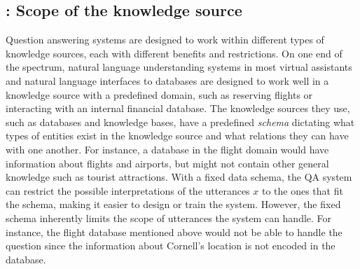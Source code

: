 \subsection{\Breadth: Scope of the knowledge source}
\label{sec:intro-breadth}

Question answering systems are designed to work
within different types of knowledge sources,
each with different benefits and restrictions.
On one end of the spectrum,
natural language understanding systems
in most virtual assistants
\cite{pieraccini1991stochastic,raymond2007generative,mesnil2014using}
and natural language interfaces to databases
\cite{hendrix1978developing,androutsopoulos95nlidb}
are designed to work well in a knowledge source
with a predefined domain,
such as reserving flights or interacting
with an internal financial database.
The knowledge sources they use,
such as databases and knowledge bases,
have a predefined \emph{schema}
dictating what types of entities exist in the knowledge source
and what relations they can have with one another.
For instance,
a database in the flight domain
would have information about flights and airports,
but might not contain other general knowledge such as tourist attractions.
With a fixed data schema,
the QA system can restrict the possible
interpretations of the utterances $x$
to the ones that fit the schema,
making it easier to design or train the system.
However,
the fixed schema
inherently limits
the scope of utterances the system can handle.
For instance, the flight database mentioned above
would not be able to handle the question
since the information about Cornell's location
is not encoded in the database.

